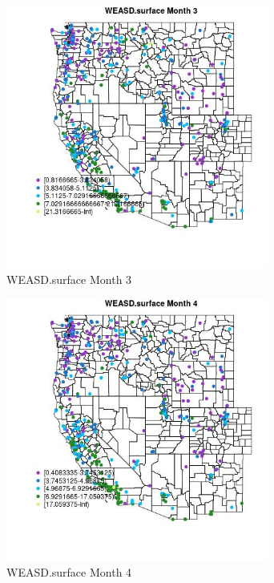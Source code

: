 \begin{figure} 
\centering  
\includegraphics[width=0.77\textwidth]{Code_Outputs/ML_input_report_ML_input_PM25_Step5_part_d_de_duplicated_aves_ML_input_MapObsMo3WEASDsurface.jpg} 
\caption{\label{fig:ML_input_report_ML_input_PM25_Step5_part_d_de_duplicated_aves_ML_inputMapObsMo3WEASDsurface}WEASD.surface Month 3} 
\end{figure} 
 

\begin{figure} 
\centering  
\includegraphics[width=0.77\textwidth]{Code_Outputs/ML_input_report_ML_input_PM25_Step5_part_d_de_duplicated_aves_ML_input_MapObsMo4WEASDsurface.jpg} 
\caption{\label{fig:ML_input_report_ML_input_PM25_Step5_part_d_de_duplicated_aves_ML_inputMapObsMo4WEASDsurface}WEASD.surface Month 4} 
\end{figure} 
 

